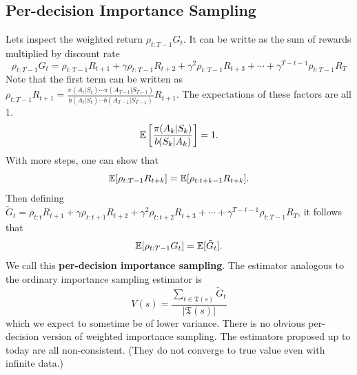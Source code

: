 \documentclass[../../main.tex]{subfiles}
\begin{document}
    \subsection{Per-decision Importance Sampling}
        Lets inspect the weighted return $\rho_{t:T-1}G_t$. It can be writte as the sum of rewards multiplied by discount rate
        \begin{equation}
            \rho_{t:T-1}G_t = \rho_{t:T-1}R_{t+1} + \gamma \rho_{t:T-1}R_{t+2} + \gamma^2 \rho_{t:T-1}R_{t+3} + \cdots + \gamma^{T-t-1}\rho_{t:T-1}R_T
        \end{equation}
        Note that the first term can be written as $\rho_{t:T-1}R_{t+1} = \frac{\pi(A_t|S_t)\cdots\pi(A_{T-1}|S_{T-1})}{b(A_t|S_t)\cdots b(A_{T-1}|S_{T-1})}R_{t+1}$.
        The expectations of these factors are all 1.
        \begin{equation}
            \mathbb{E}\left[\frac{\pi(A_k|S_k)}{b(S_k|A_k)}\right]=1.
        \end{equation}
        With more steps, one can show that
        \begin{equation}
            \mathbb{E}[\rho_{t:T-1}R_{t+k}]=\mathbb{E}[\rho_{t:t+k-1}R_{t+k}].
        \end{equation}
        Then defining $\tilde{G}_t = \rho_{t:t}R_{t+1} + \gamma \rho_{t:t+1}R_{t+2} + \gamma^2 \rho_{t:t+2}R_{t+3} + \cdots + \gamma^{T-t-1}\rho_{t:T-1}R_T$,
        it follows that
        \begin{equation}
            \mathbb{E}[\rho_{t:T-1}G_t] = \mathbb{E}[\tilde{G}_t].
        \end{equation}
        We call this \textbf{per-decision importance sampling}. The estimator analogous to the ordinary importance sampling estimator is
        \begin{equation}
            V(s) = \frac{\sum_{t \in \mathfrak{T}(s)}\tilde{G}_t}{|\mathfrak{T}(s)|}
        \end{equation}
        which we expect to sometime be of lower variance.
        There is no obvious per-decision version of weighted importance sampling. The estimators proposed up to today are all non-consistent. (They do not converge to true value even with infinite data.)
\end{document}
